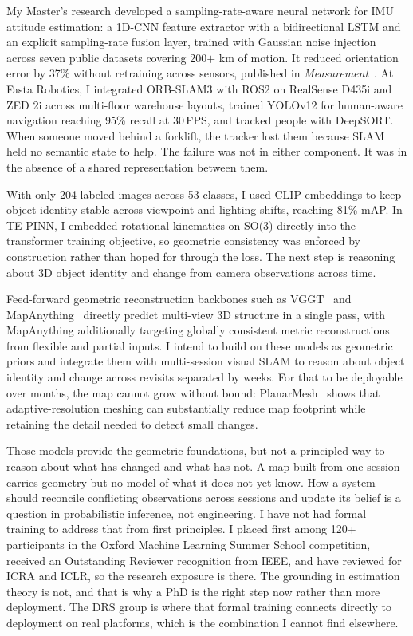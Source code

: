 \documentclass[11pt,a4paper]{article}
\begin{document}
My Master's research developed a sampling-rate-aware neural network
for IMU attitude estimation: a 1D-CNN feature extractor with a
bidirectional LSTM and an explicit sampling-rate fusion layer, trained
with Gaussian noise injection across seven public datasets covering
200$+$ km of motion. It reduced orientation error by 37\% without
retraining across sensors, published in
\textit{Measurement}~\cite{golroudbari2023imu}. At Fasta Robotics, I
integrated ORB-SLAM3 with ROS2 on RealSense D435i and ZED 2i across multi-floor warehouse layouts, trained YOLOv12 for human-aware navigation reaching 95\% recall at
30\,FPS, and tracked people with DeepSORT. When someone moved behind a
forklift, the tracker lost them because SLAM held no semantic state to
help. The failure was not in either component. It was in the absence
of a shared representation between them.

With only 204 labeled images across 53 classes, I used CLIP embeddings
to keep object identity stable across viewpoint and lighting shifts,
reaching 81\% mAP. In TE-PINN, I embedded rotational kinematics on
SO(3) directly into the transformer training objective, so geometric
consistency was enforced by construction rather than hoped for through
the loss. The next step is reasoning about 3D object identity and change
from camera observations across time. 

Feed-forward geometric reconstruction backbones such as 
VGGT~\cite{wang2025vggt} and MapAnything~\cite{keetha2025mapanything} 
directly predict multi-view 3D structure in a single pass, with 
MapAnything additionally targeting globally consistent metric 
reconstructions from flexible and partial inputs. I intend to build 
on these models as geometric priors and integrate them with 
multi-session visual SLAM to reason about object identity and change 
across revisits separated by weeks. For that to be deployable over 
months, the map cannot grow without bound: PlanarMesh~\cite{wang2025planarmesh} 
shows that adaptive-resolution meshing can substantially reduce map 
footprint while retaining the detail needed to detect small changes.


Those models provide the geometric foundations, but not a principled 
way to reason about what has changed and what has not. A map built 
from one session carries geometry but no model of what it does not 
yet know. How a system should reconcile conflicting observations 
across sessions and update its belief is a question in probabilistic 
inference, not engineering. I have not had formal training to address 
that from first principles. I placed first among 120+ participants in the Oxford Machine Learning 
Summer School competition, received an Outstanding Reviewer recognition 
from IEEE, and have reviewed for ICRA and ICLR, so the research 
exposure is there. The grounding 
in estimation theory is not, and that is why a PhD is the right step 
now rather than more deployment. The DRS group is where that formal 
training connects directly to deployment on real platforms, which is 
the combination I cannot find elsewhere.
\end{document}
